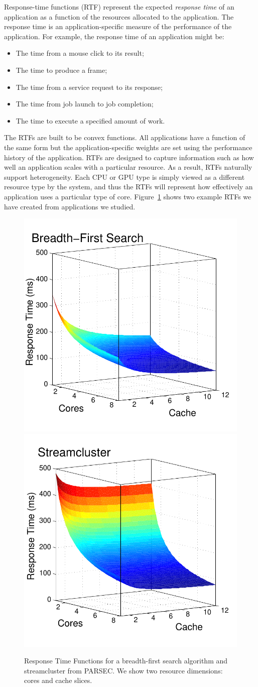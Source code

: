 Response-time functions (RTF) represent the expected \emph{response
  time} of an application as a function of the resources allocated to
the application. The response time is an application-specific measure
of the performance of the application.  For example, the response time
of an application might be:
    \begin{itemize}\itemsep0pt \parskip0pt 
    \item The time from a mouse click to its result;
    \item The time to produce a frame;
    \item The time from a service request to its response;
    \item The time from job launch to job completion;
    \item The time to execute a specified amount of work.
    \end{itemize}

The RTFs are built to be convex functions.  All applications have a
function of the same form but the application-specific weights are set
using the performance history of the application.  RTFs are designed
to capture information such as how well an application scales with a
particular resource. As a result, RTFs naturally support
heterogeneity.  Each CPU or GPU type is simply viewed as a different
resource type by the system, and thus the RTFs will represent how
effectively an application uses a particular type of
core. Figure~\ref{sample_rtf} shows two example RTFs we have created
from applications we studied.

\begin{figure}[hb]
\includegraphics*[bb=0 0 360 360,width=.49\columnwidth]{Figures/bfs-fig.pdf}
\includegraphics*[bb=0 0 360
  360,width=.49\columnwidth]{Figures/streamcluster-fig.pdf}
\caption{\label{sample_rtf} Response Time Functions for a
  breadth-first search algorithm and streamcluster from PARSEC. We show two resource dimensions: cores and cache slices.}
\end{figure}

